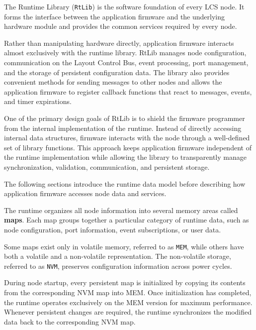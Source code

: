 %

The Runtime Library (\texttt{RtLib}) is the software foundation of every LCS node.
It forms the interface between the application firmware and the underlying hardware
module and provides the common services required by every node.

Rather than manipulating hardware directly, application firmware interacts almost
exclusively with the runtime library. RtLib manages node configuration, 
communication on the Layout Control Bus, event processing, port management, and 
the storage of persistent configuration data. The library also provides convenient 
methods for sending messages to other nodes and allows the application firmware to
register callback functions that react to messages, events, and timer expirations.

One of the primary design goals of RtLib is to shield the firmware programmer from 
the internal implementation of the runtime. Instead of directly accessing internal 
data structures, firmware interacts with the node through a well-defined set of 
library functions. This approach keeps application firmware independent of the 
runtime implementation while allowing the library to transparently manage 
synchronization, validation, communication, and persistent storage.

The following sections introduce the runtime data model before describing how 
application firmware accesses node data and services.


The runtime organizes all node information into several memory areas called 
\textbf{maps}. Each map groups together a particular category of runtime data, 
such as node configuration, port information, event subscriptions, or user data.

Some maps exist only in volatile memory, referred to as \texttt{MEM}, while 
others have both a volatile and a non-volatile representation. The non-volatile 
storage, referred to as \texttt{NVM}, preserves configuration information across 
power cycles.

During node startup, every persistent map is initialized by copying its contents 
from the corresponding NVM map into MEM. Once initialization has completed, the 
runtime operates exclusively on the MEM version for maximum performance. Whenever 
persistent changes are required, the runtime synchronizes the modified data back 
to the corresponding NVM map.

